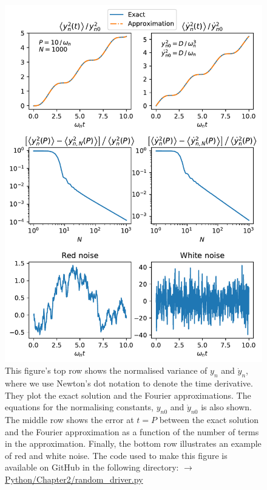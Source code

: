 \begin{figure}
    \centering
    \vspace{-30pt}
    \includegraphics[width=\textwidth,height=0.9\textheight,keepaspectratio]{figures/chapter02/noisy_driver.pdf}
    \vspace{-10pt}
    \caption{This figure's top row shows the normalised variance of $y_n$ and $\dot{y}_n$, where we use Newton's dot notation to denote the time derivative. They plot the exact solution and the Fourier approximations. The equations for the normalising constants, $y_{n0}$ and $\dot{y}_{n0}$ is also shown. The middle row shows the error at $t=P$ between the exact solution and the Fourier approximation as a function of the number of terms in the approximation. Finally, the bottom row illustrates an example of red and white noise. The code used to make this figure is available on GitHub in the following directory:\newline
    \href{https://github.com/aleksyprok/apkp_thesis/blob/main/Python/Chapter2/random_driver.py}{$\rightarrow$ Python/Chapter2/random\_driver.py}}
    \vspace{-20pt}
    \label{fig:noisy_driver}
\end{figure}

